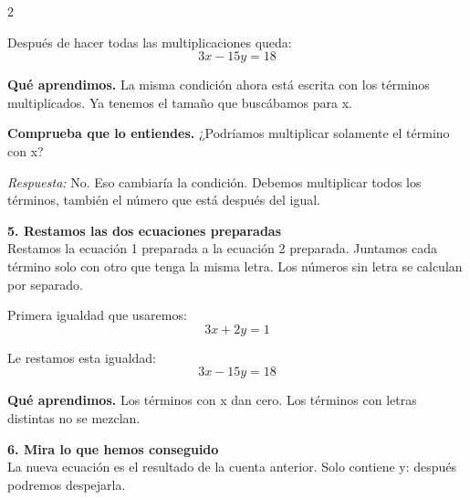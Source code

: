 \documentclass[11pt,a4paper,landscape]{article}
\begin{document}
\begin{multicols*}{2}
\begin{minipage}{\linewidth}
\par\smallskip Después de hacer todas las multiplicaciones queda:
\[3x - 15y = 18\]
\par\smallskip\textbf{Qué aprendimos.} La misma condición ahora está escrita con los términos multiplicados. Ya tenemos el tamaño que buscábamos para x.
\par\smallskip\textbf{Comprueba que lo entiendes.} ¿Podríamos multiplicar solamente el término con x?\par\textit{Respuesta:} No. Eso cambiaría la condición. Debemos multiplicar todos los términos, también el número que está después del igual.
\end{minipage}\par\medskip
\noindent\begin{minipage}{\linewidth}\textbf{5. Restamos las dos ecuaciones preparadas}\\[2pt]Restamos la ecuación 1 preparada a la ecuación 2 preparada. Juntamos cada término solo con otro que tenga la misma letra. Los números sin letra se calculan por separado.
\par{}\par\smallskip
\par\smallskip Primera igualdad que usaremos:
\[3x + 2y = 1\]
\par\smallskip Le restamos esta igualdad:
\[3x - 15y = 18\]
\par\smallskip\textbf{Qué aprendimos.} Los términos con x dan cero. Los términos con letras distintas no se mezclan.
\end{minipage}\par\medskip
\noindent\begin{minipage}{\linewidth}\textbf{6. Mira lo que hemos conseguido}\\[2pt]La nueva ecuación es el resultado de la cuenta anterior. Solo contiene y: después podremos despejarla.

\end{minipage}
\end{multicols*}
\end{document}
